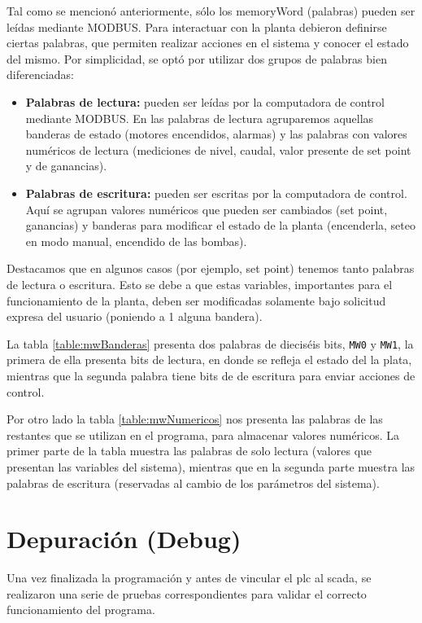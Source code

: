 Tal como se mencionó anteriormente, sólo los \gls{memoryWord} (palabras) pueden
ser leídas mediante MODBUS.
Para interactuar con la planta debieron definirse ciertas palabras, que
permiten realizar acciones en el sistema y conocer el estado del mismo.
Por simplicidad, se optó por utilizar dos grupos de palabras bien
diferenciadas:
\begin{itemize}
 \item \textbf{Palabras de lectura:} pueden ser leídas por la computadora de
control mediante MODBUS. En las palabras de lectura agruparemos aquellas
banderas de estado (motores encendidos, alarmas) y las palabras con valores
numéricos de lectura (mediciones de nivel, caudal, valor presente de set point
y de ganancias).
 \item \textbf{Palabras de escritura:} pueden ser escritas por la computadora
de control. Aquí se agrupan valores numéricos que pueden ser cambiados (set
point, ganancias) y banderas para modificar el estado de la planta (encenderla,
seteo en modo manual, encendido de las bombas).
\end{itemize}

Destacamos que en algunos casos (por ejemplo, set point) tenemos tanto palabras
de lectura o escritura.
Esto se debe a que estas variables, importantes para el funcionamiento de la
planta, deben ser modificadas solamente bajo solicitud expresa del usuario
(poniendo a 1 alguna bandera).

La tabla \ref{table:mwBanderas} presenta dos palabras de dieciséis
bits, \verb|MW0| y \verb|MW1|, la primera de ella presenta bits de lectura, en
donde se
refleja el estado del la plata, mientras que la segunda palabra tiene bits de
de escritura para enviar acciones de control.

Por otro lado la tabla \ref{table:mwNumericos} nos presenta
las palabras de las restantes que se utilizan en el programa, para
almacenar valores numéricos.
La primer parte de la tabla muestra las palabras de solo lectura (valores que
presentan las variables del sistema), mientras que en la
segunda parte muestra las palabras de escritura (reservadas al cambio
de los parámetros del sistema).

\section{Depuración (Debug)}
\label{sec:Debug}

Una vez finalizada la programación y antes de vincular el \gls{plc}
al \gls{scada}, se realizaron una serie de pruebas correspondientes para
validar el correcto funcionamiento del programa.

